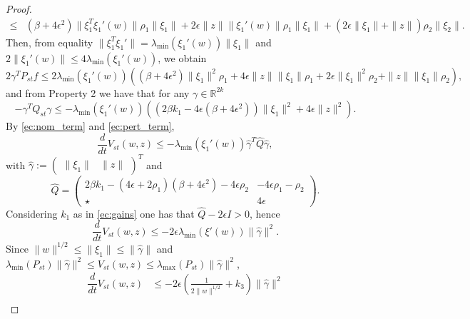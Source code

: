 \documentclass[onecolumn]{IEEEtran}
\newtheorem{proof}{Proof}
\begin{document}
\begin{proof}
\begin{equation*}
\begin{split}
	\leq& (\beta+4\epsilon^2)\|\xi_1^T\xi_1'(w)\|\rho_1\|\xi_1\|+2\epsilon \|z\|\|\xi_1'(w)\|\rho_1\|\xi_1\|+\left(2\epsilon \|\xi_1\|+\|z\|\right)\rho_2\|\xi_2\|.
	\end{split}
	\end{equation*}
	Then,  from  equality  $\|\xi_1^T \xi_1'\|=\lambda_{\min}(\xi_1'(w)) \|\xi_1\|$  and $2\|\xi_1'(w)\|\leq 4\lambda_{\min}(\xi_1'(w))$, we obtain
	\begin{equation}
	\label{ec:pert_term}
	2\gamma^TP_{st}f\leq 2\lambda_{\min}(\xi_1'(w))(   (\beta+4\epsilon^2)\|\xi_1\|^2\rho_1+4\epsilon\|z\|\|\xi_1\|\rho_1+2\epsilon \|\xi_1\|^2\rho_2+\|z\|\|\xi_1\|\rho_2),
	\end{equation}
	and  from Property 2  we have that for any $\gamma \in \mathbb{R}^{2k}$
	\begin{equation}
	\label{ec:nom_term}
	-\gamma^T Q_{st}\gamma\leq -\lambda_{\min}(\xi_1'(w))\left(\left(2\beta k_1-4\epsilon \left(\beta+4\epsilon^2\right)\right)\|\xi_1\|^2+4\epsilon \|z\|^2\right). 
	\end{equation}
	By \eqref{ec:nom_term} and \eqref{ec:pert_term}, 
	\begin{equation*}
	\dfrac{d}{dt}V_{st}(w,z)\leq -\lambda_{\min}(\xi_1'(w))\hat \gamma^T \hat Q \hat \gamma,
	\end{equation*}
	with $\hat \gamma:=\begin{pmatrix}
	\|\xi_1\| & \|z\|
	\end{pmatrix}^T$ and
	\begin{equation*}
	\hat Q=\begin{pmatrix}
	2\beta k_1-(4\epsilon+2\rho_1)(\beta+4\epsilon^2)-4\epsilon \rho_2 & -4\epsilon \rho_1-\rho_2\\
	\star & 4\epsilon
	\end{pmatrix}.
	\end{equation*}
	Considering $k_1$ as in \eqref{ec:gains}
	one has that  $\hat Q-2\epsilon I>0$, hence
	\begin{equation*}
	\dfrac{d}{dt}V_{st}(w,z)\leq -2\epsilon \lambda_{\min}(\xi'(w))\|\hat \gamma\|^2.
	\end{equation*}
	Since $\|w\|^{1/2}\leq \|\xi_1\|\leq \|\hat \gamma\|$ and $\lambda_{\min}(P_{st})\|\hat \gamma\|^2\leq V_{st}(w,z)\leq \lambda_{\max}(P_{st})\|\hat \gamma\|^2$, 
	\begin{equation*}
	\begin{split}
	\dfrac{d}{dt}V_{st}(w,z)&\leq -2\epsilon \left(\frac{1}{2\|w\|^{1/2}}+k_3\right)\|\hat \gamma\|^2\\

\end{split}
\end{equation*}
\end{proof}
\end{document}
